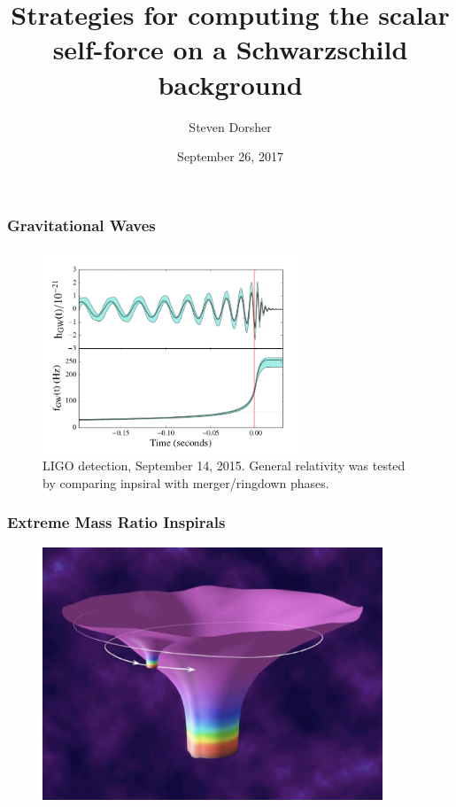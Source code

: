 \documentclass{beamer}
\title{Strategies for computing the scalar self-force on a Schwarzschild background}
\author{Steven Dorsher}
\institute{Louisiana State University}
\date{September 26, 2017}
\begin{document}
\frame{\titlepage}


\begin{frame}
  \frametitle{Gravitational Waves}
  \begin{figure}
    \includegraphics[width=3.0in]{LIGOGRtest.png}
    \caption{LIGO detection, September 14, 2015. General relativity was tested by comparing inpsiral with merger/ringdown phases.}
  \end{figure}
\end{frame}




\begin{frame}
  \frametitle{Extreme Mass Ratio Inspirals}
  \begin{figure}
    \includegraphics[width=4.0in]{EMRI}
  \end{figure}
\end{frame}
\end{document}
